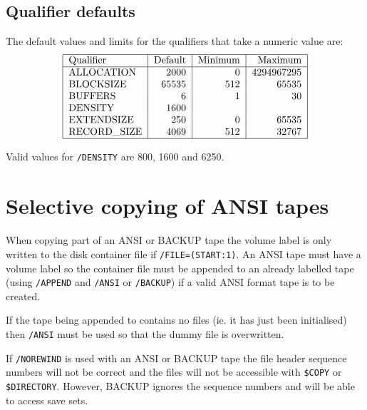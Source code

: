 \subsection{Qualifier defaults}
The default values and limits for the qualifiers that take a numeric value are:
\[\tt\begin{tabular}{|l|r|r|r|}\hline
Qualifier    &Default &Minimum &Maximum \\\hline
ALLOCATION   &2000    &0       &4294967295\\
BLOCKSIZE    &65535   &512     &65535   \\
BUFFERS      &6       &1       &30      \\
DENSITY      &1600    &        &        \\
EXTENDSIZE   &250     &0       &65535   \\
RECORD\_SIZE &4069    &512     &32767   \\
\hline\end{tabular}\]

Valid values for {\tt/DENSITY} are 800, 1600 and 6250.

\section{Selective copying of ANSI tapes}\label{selective}

When copying part of an ANSI or BACKUP tape the volume label is only written to
the disk container file if {\tt/FILE=(START:1)}. An ANSI tape must have a
volume label so the container file must  be appended to an already labelled
tape (using {\tt/APPEND} and {\tt/ANSI} or {\tt/BACKUP}) if a valid ANSI format
tape is to be created. 

If the tape being appended to contains no files (ie. it has just been
initialised) then {\tt/ANSI} must be used so that the dummy file is
overwritten.

If {\tt/NOREWIND} is used with an ANSI or BACKUP tape the file header sequence
numbers will not be correct and the files will not be accessible with
{\tt\$COPY} or {\tt\$DIRECTORY}. However, BACKUP ignores the sequence numbers
and will be able to access save sets. 
